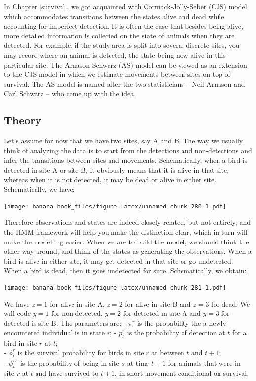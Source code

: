 \documentclass[
  12pt,
]{krantz}
\begin{document}
In Chapter \ref{survival}, we got acquainted with Cormack-Jolly-Seber (CJS) model which accommodates transitions between the states alive and dead while accounting for imperfect detection. It is often the case that besides being alive, more detailed information is collected on the state of animals when they are detected. For example, if the study area is split into several discrete sites, you may record where an animal is detected, the state being now alive in this particular site. The Arnason-Schwarz (AS) model can be viewed as an extension to the CJS model in which we estimate movements between sites on top of survival. The AS model is named after the two statisticians -- Neil Arnason and Carl Schwarz -- who came up with the idea.

\hypertarget{theory}{%
\subsection{Theory}\label{theory}}

Let's assume for now that we have two sites, say A and B. The way we usually think of analyzing the data is to start from the detections and non-detections and infer the transitions between sites and movements. Schematically, when a bird is detected in site A or site B, it obviously means that it is alive in that site, whereas when it is not detected, it may be dead or alive in either site. Schematically, we have:

\texttt{[image: banana-book\_files/figure-latex/unnamed-chunk-280-1.pdf]}

Therefore observations and states are indeed closely related, but not entirely, and the HMM framework will help you make the distinction clear, which in turn will make the modelling easier. When we are to build the model, we should think the other way around, and think of the states as generating the observations. When a bird is alive in either site, it may get detected in that site or go undetected. When a bird is dead, then it goes undetected for sure. Schematically, we obtain:

\texttt{[image: banana-book\_files/figure-latex/unnamed-chunk-281-1.pdf]}

We have \(z = 1\) for alive in site A, \(z = 2\) for alive in site B and \(z = 3\) for dead. We will code \(y = 1\) for non-detected, \(y = 2\) for detected in site A and \(y = 3\) for detected is site B. The parameters are:
- \(\pi^r\) is the probability the a newly encountered individual is in state \(r\);
- \(p_t^r\) is the probability of detection at \(t\) for a bird in site \(r\) at \(t\);\\
- \(\phi_t^r\) is the survival probability for birds in site \(r\) at between \(t\) and \(t+1\);\\
- \(\psi_t^{rs}\) is the probability of being in site \(s\) at time \(t+1\) for animals that were in site \(r\) at \(t\) and have survived to \(t+1\), in short movement conditional on survival.
\end{document}
